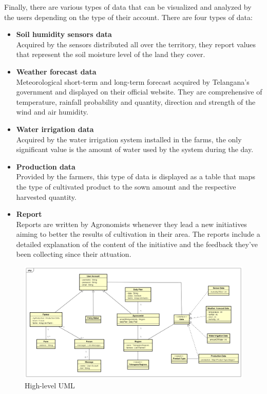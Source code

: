 \documentclass[table, 12pt]{article}
\begin{document}
Finally, there are various types of data that can be visualized and analyzed by the users
depending on the type of their account.
There are four types of data:
\begin{itemize}
    \item \textbf{Soil humidity sensors data}\\
    Acquired by the sensors distributed all over the territory, they report values that represent the soil moisture level of the land they cover.
    \item \textbf{Weather forecast data}\\
    Meteorological short-term and long-term forecast acquired by Telangana's government and displayed on their official website. They are comprehensive of temperature, rainfall probability and quantity, direction and strength of the wind and air humidity.
    \item \textbf{Water irrigation data}\\
    Acquired by the water irrigation system installed in the farms, the only significant value is the amount of water used by the system during the day.
    \item \textbf{Production data}\\
    Provided by the farmers, this type of data is displayed as a table that maps the type of cultivated product to the sown amount and the respective harvested quantity.
    \item \textbf{Report}\\
    Reports are written by Agronomists whenever they lead a new initiatives aiming to better the results of cultivation in their area. The reports include a detailed explanation of the content of the initiative and the feedback they've been collecting since their attuation.
\end{itemize}
\begin{center}
    \begin{figure}[H]
        \includegraphics[scale=0.45, center]{assets/UML/UML.png}
        \caption{High-level UML}
        \label{fig: UML}
    \end{figure}
\end{center}
\end{document}
